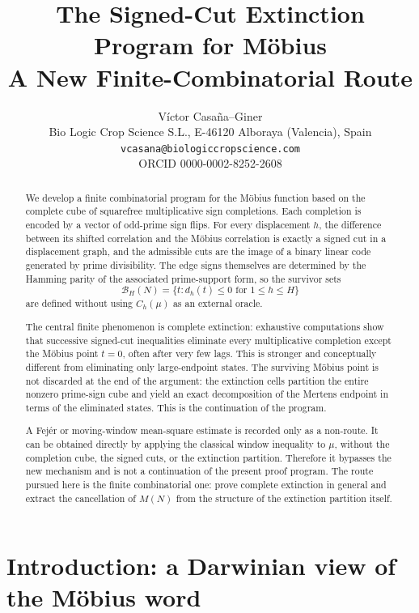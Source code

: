 \documentclass[11pt]{article}
\title{The Signed-Cut Extinction Program for M\"obius\\
A New Finite-Combinatorial Route}
\author{V\'ictor Casa\~na--Giner\\
Bio Logic Crop Science S.L., E-46120 Alboraya (Valencia), Spain\\
\texttt{vcasana@biologiccropscience.com}\\
ORCID 0000-0002-8252-2608}
\date{}
\theoremstyle{definition}
\theoremstyle{remark}
\begin{document}
\maketitle

\begin{abstract}
We develop a finite combinatorial program for the M\"obius function based on the complete cube of squarefree multiplicative sign completions.  Each completion is encoded by a vector of odd-prime sign flips.  For every displacement $h$, the difference between its shifted correlation and the M\"obius correlation is exactly a signed cut in a displacement graph, and the admissible cuts are the image of a binary linear code generated by prime divisibility.  The edge signs themselves are determined by the Hamming parity of the associated prime-support form, so the survivor sets
\[
 \mathcal B_H(N)=\{t:d_h(t)\le0\text{ for }1\le h\le H\}
\]
are defined without using $C_h(\mu)$ as an external oracle.

The central finite phenomenon is complete extinction: exhaustive computations show that successive signed-cut inequalities eliminate every multiplicative completion except the M\"obius point $t=0$, often after very few lags.  This is stronger and conceptually different from eliminating only large-endpoint states.  The surviving M\"obius point is not discarded at the end of the argument: the extinction cells partition the entire nonzero prime-sign cube and yield an exact decomposition of the Mertens endpoint in terms of the eliminated states.  This is the continuation of the program.

A Fej\'er or moving-window mean-square estimate is recorded only as a non-route.  It can be obtained directly by applying the classical window inequality to $\mu$, without the completion cube, the signed cuts, or the extinction partition.  Therefore it bypasses the new mechanism and is not a continuation of the present proof program.  The route pursued here is the finite combinatorial one: prove complete extinction in general and extract the cancellation of $M(N)$ from the structure of the extinction partition itself.
\end{abstract}


\section{Introduction: a Darwinian view of the M\"obius word}
\end{document}
